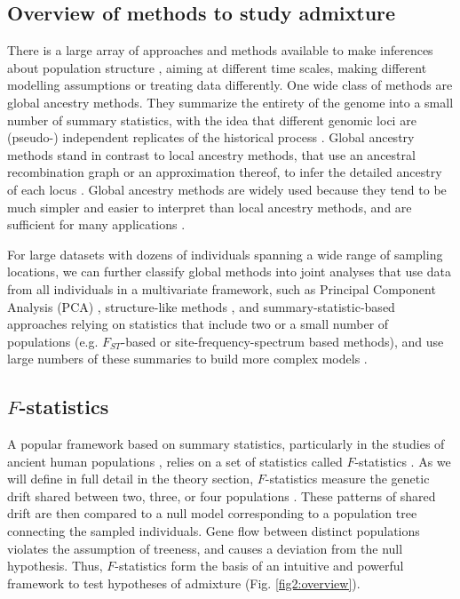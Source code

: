 \documentclass[12pt]{article}
\begin{document}
\subsection{Overview of methods to study admixture}
There is a large array of approaches and methods available to make inferences about population structure \citep{schraiber_methods_2015}, aiming at different time scales, making different modelling assumptions or treating data differently. 
One wide class of methods are global ancestry methods. They summarize the entirety of the genome into a small number of summary statistics, with the idea that different genomic loci are (pseudo-) independent replicates of the historical process \citep{pritchard_inference_2000, gopalan_scaling_2016, patterson_ancient_2012,alexander_fast_2009, tang_estimation_2005}. Global ancestry methods stand in contrast to local ancestry methods, that use an ancestral recombination graph or an approximation thereof, to infer the detailed ancestry of each locus  \citep{lawson_inference_2012, hellenthal_genetic_2014, speidel_method_2019, kelleher_inferring_2019}. Global ancestry methods are widely used because they tend to be much simpler and easier to interpret than local ancestry methods, and are sufficient for many applications \citep{pritchard_inference_2000, patterson_population_2006}.

For large datasets with dozens of individuals spanning a wide range of sampling locations, we can further classify global methods into joint analyses that use data from all individuals in a multivariate framework, such as Principal Component Analysis (PCA) \citep{cavalli-sforza_analysis_1975, patterson_population_2006, novembre_genes_2008}, structure-like methods \citep{pritchard_inference_2000, alexander_fast_2009}, and summary-statistic-based approaches relying on statistics that include two or a small number of populations (e.g. $F_{ST}$-based or site-frequency-spectrum based methods), and use large numbers of these summaries to build more complex models \citep{excoffier_fastsimcoal_2011, kamm_efficiently_2020, gutenkunst_inferring_2009}. 

\subsection{$F$-statistics}
A popular framework based on summary statistics, particularly in the studies of ancient human populations \citep{orlando_ancient_2021}, relies on a set of statistics called $F$-statistics \citep{patterson_ancient_2012, peter_admixture_2016}. As we will define in full detail in the theory section, $F$-statistics measure the genetic drift shared between two, three, or four populations \citep{patterson_ancient_2012, peter_admixture_2016}. These patterns of shared drift are then compared to a null model corresponding to a population tree connecting the sampled individuals. Gene flow between distinct populations violates the assumption of treeness, and causes a deviation from the null hypothesis. Thus, $F$-statistics form the basis of an intuitive and powerful framework to test hypotheses of admixture (Fig. \ref{fig2:overview}). 
\end{document}
